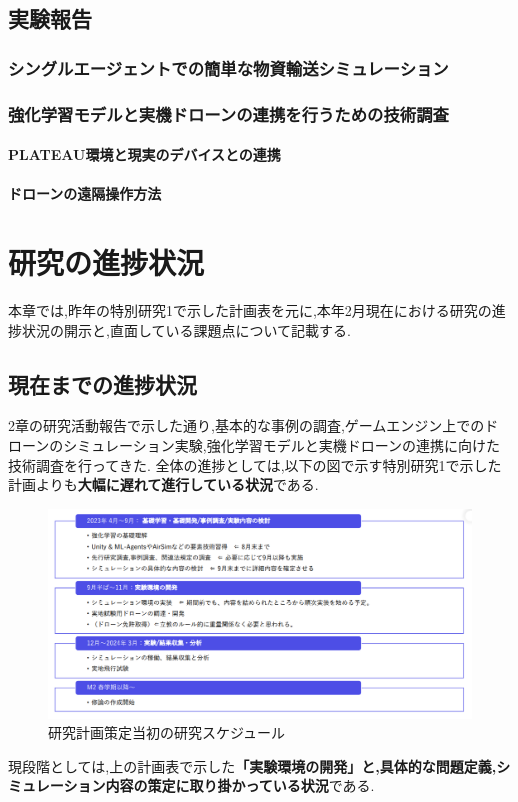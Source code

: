 \documentclass{article}[jsarticle]
\begin{document}
\subsection{実験報告}
\subsubsection{シングルエージェントでの簡単な物資輸送シミュレーション}
\subsubsection{強化学習モデルと実機ドローンの連携を行うための技術調査}
\paragraph{PLATEAU環境と現実のデバイスとの連携}
\paragraph{ドローンの遠隔操作方法}


\section{研究の進捗状況}
本章では,昨年の特別研究1で示した計画表を元に,本年2月現在における研究の進捗状況の開示と,直面している課題点について記載する.
\subsection{現在までの進捗状況}
2章の研究活動報告で示した通り,基本的な事例の調査,ゲームエンジン上でのドローンのシミュレーション実験,強化学習モデルと実機ドローンの連携に向けた技術調査を行ってきた.
全体の進捗としては,以下の図で示す特別研究1で示した計画よりも\textbf{大幅に遅れて進行している状況}である.
\begin{figure}[H]
    \centering
    \includegraphics[width=\textwidth]{./Images/20240203171846.png}
    \captionsetup{justification=centering}
    \caption{研究計画策定当初の研究スケジュール}
\end{figure}
現段階としては,上の計画表で示した\textbf{「実験環境の開発」と,具体的な問題定義,シミュレーション内容の策定に取り掛かっている状況}である.
\end{document}
